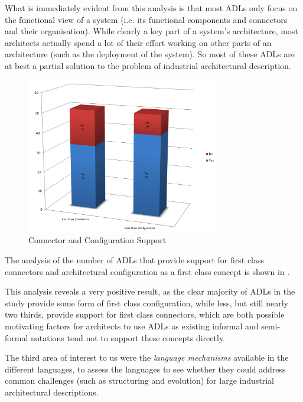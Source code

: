 What is immediately evident from this analysis is that most ADLs only focus on the functional view of a system (i.e. its functional components and connectors and their organisation).  While clearly a key part of a system's architecture, most architects actually spend a lot of their effort working on other parts of an architecture (such as the deployment of the system).  So most of these ADLs are at best a partial solution to the problem of industrial architectural description.

\begin{figure}
\centering
\includegraphics[width=0.75\textwidth]{Figures/litreview-adl-candc}
\caption{Connector and Configuration Support}
\label{figure:litreview-adl-candc}
\end{figure}

The analysis of the number of ADLs that provide support for first class connectors and architectural configuration as a first class concept is shown in .

This analysis reveals a very positive result, as the clear majority of ADLs in the study provide some form of first class configuration, while less, but still nearly two thirds, provide support for first class connectors, which are both possible motivating factors for architects to use ADLs as existing informal and semi-formal notations tend not to support these concepts directly.

The third area of interest to us were the \emph{language mechanisms} available in the different languages, to assess the languages to see whether they could address common challenges (such as structuring and evolution) for large industrial architectural descriptions.

